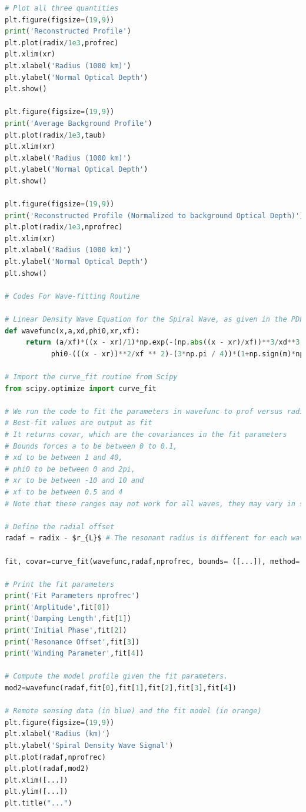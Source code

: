 \documentclass{article}
\begin{document}
\begin{lstlisting}[language=Python, caption=Python code snippet for Spiral Density Wave Analysis.]
# Plot all three quantities
plt.figure(figsize=(19,9))
print('Reconstructed Profile')
plt.plot(radix/1e3,profrec)
plt.xlim(xr)
plt.xlabel('Radius (1000 km)')
plt.ylabel('Normal Optical Depth')
plt.show()

plt.figure(figsize=(19,9))
print('Average Background Profile')
plt.plot(radix/1e3,taub)
plt.xlim(xr)
plt.xlabel('Radius (1000 km)')
plt.ylabel('Normal Optical Depth')
plt.show()

plt.figure(figsize=(19,9))
print('Reconstructed Profile (Normalized to background Optical Depth)')
plt.plot(radix/1e3,nprofrec)
plt.xlim(xr)
plt.xlabel('Radius (1000 km)')
plt.ylabel('Normal Optical Depth')
plt.show()

# Codes For Wave-fitting Routine

# Linear Density Wave Equation for the Spiral Wave, as given in the PDF document attached
def wavefunc(x,a,xd,phi0,xr,xf):
     return (a/xf)*((x - xr)/1)*np.exp(-(np.abs((x - xr)/xf))**3/xd**3)*np.cos(
           phi0-(((x - xr))**2/xf ** 2)-(3*np.pi / 4))*(1+np.sign(m)*np.sign((x-xr)/xf))

# Import the curve_fit routine from Scipy
from scipy.optimize import curve_fit

# We run the code to fit the parameters in wavefunc to prof versus radi.
# Best-fit values are output as fit
# It returns covar, which are the covariances in the fit parameters
# Bounds forces a to be between 0 to 0.1, 
# xd to be between 1 and 40,
# phi0 to be between 0 and 2pi, 
# xr to be between -10 and 10 and 
# xf to be between 0.5 and 4
# Note that these ranges may not work for all waves, they may vary in some cases.

# Define the radial offset
radaf = radix - $r_{L}$ # The resonant radius is different for each wave.

fit, covar=curve_fit(wavefunc,radaf,nprofrec, bounds= ([...]), method='trf')

# Print the fit parameters
print('Fit Parameters nprofrec')
print('Amplitude',fit[0])
print('Damping Length',fit[1])
print('Initial Phase',fit[2])
print('Resonance Offset',fit[3])
print('Winding Parameter',fit[4])

# Compute the model profile given the fit parameters.
mod2=wavefunc(radaf,fit[0],fit[1],fit[2],fit[3],fit[4])

# Remote sensing data (in blue) and the fit model (in orange)
plt.figure(figsize=(19,9))
plt.xlabel('Radius (km)')
plt.ylabel('Spiral Density Wave Signal')
plt.plot(radaf,nprofrec)
plt.plot(radaf,mod2)
plt.xlim([...])
plt.ylim([...])
plt.title("...")
\end{lstlisting}
\end{document}
